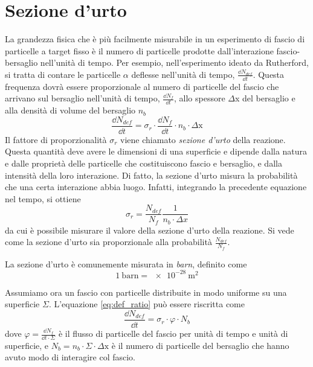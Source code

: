 \documentclass[../main.tex]{subfiles}
\begin{document}
\section{Sezione d'urto}
La grandezza fisica che è più facilmente misurabile in un esperimento di fascio di particelle a target fisso è il numero di particelle prodotte dall'interazione fascio-bersaglio nell'unità di tempo. Per esempio, nell'esperimento ideato da Rutherford, si tratta di contare le particelle $\alpha$ deflesse nell'unità di tempo, $\frac{\dd N_{def}}{\dd t}$. 
Questa frequenza dovrà essere proporzionale al numero di particelle del fascio che arrivano sul bersaglio nell'unità di tempo, $\frac{\dd N_f}{\dd t}$, allo spessore $\Delta$x del bersaglio e alla densità di volume del bersaglio $n_b$
\begin{equation} \label{eq:def_ratio}
    \frac{\dd N_{def}}{\dd t} = \sigma_r \cdot \frac{\dd N_f}{\dd t} \cdot n_b \cdot \Delta \mathrm{x}
\end{equation}
Il fattore di proporzionalità $\sigma_r$ viene chiamato \textit{sezione d'urto} della reazione. Questa quantità deve avere le dimensioni di una superficie e dipende dalla natura e dalle proprietà delle particelle che costituiscono fascio e bersaglio, e dalla intensità della loro interazione. Di fatto, la sezione d'urto misura la probabilità che una certa interazione abbia luogo. Infatti, integrando la precedente equazione nel tempo, si ottiene 
\begin{equation}
    \sigma_r = \frac{N_{def}}{N_f} \frac{1}{n_b \cdot \Delta x}
\end{equation}
da cui è possibile misurare il valore della sezione d'urto della reazione. Si vede come la sezione d'urto sia proporzionale alla probabilità $\frac{N_{def}}{N_f}$.

La sezione d'urto è comunemente misurata in \textit{barn}, definito come
\begin{equation}
    1\ \mathrm{barn} = \SI{e-28}{\m ^2}
\end{equation}

Assumiamo ora un fascio con particelle distribuite in modo uniforme su una superficie $\Sigma$. L'equazione \ref{eq:def_ratio} può essere riscritta come 
\begin{equation}
    \frac{\dd N_{def}}{\dd t} = \sigma_r \cdot \varphi \cdot N_b
\end{equation}
dove $\varphi = \frac{\dd N_f}{\dd t \cdot \Sigma}$ è il flusso di particelle del fascio per unità di tempo e unità di superficie, e $N_b = n_b \cdot \Sigma \cdot \Delta \mathrm{x}$ è il numero di particelle del bersaglio che hanno avuto modo di interagire col fascio. 
\end{document}
